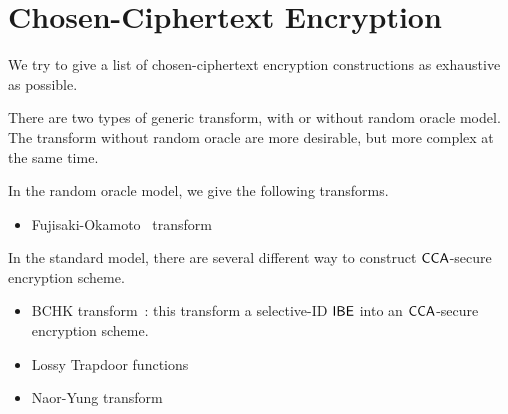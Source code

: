 \section{Chosen-Ciphertext Encryption}

We try to give a list of chosen-ciphertext encryption constructions as exhaustive as possible.


There are two types of generic transform, with or without random oracle model. The transform without random oracle are more desirable, but more complex at the same time.

In the random oracle model, we give the following transforms.
\begin{itemize}
    \item Fujisaki-Okamoto~\cite{JC:FujOka13} transform
\end{itemize}

In the standard model, there are several different way to construct $\mathsf{CCA}$-secure encryption scheme.
\begin{itemize}
    \item BCHK transform~\cite{SIAM:BCHK07}: this transform a selective-ID $\mathsf{IBE}$ into an $\mathsf{CCA}$-secure encryption scheme.
    \item Lossy Trapdoor functions~\cite{STOC:PeiWat08}
    \item Naor-Yung transform~\cite{STOC:NaoYun90} 
\end{itemize}